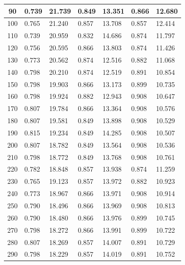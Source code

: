 \documentclass{report}
\begin{document}
\begin{minipage}{\textwidth}
\begin{longtable}{|c|l|l|l|l|l|l|}
                     90 & 0.739 & 21.739 & 0.849 & 13.351 & 0.866 & 12.680 \\ \hline
                     100 & 0.765 & 21.240 & 0.857 & 13.708 & 0.857 & 12.414 \\ \hline
                     110 & 0.739 & 20.959 & 0.832 & 14.686 & 0.874 & 11.797 \\ \hline
                     120 & 0.756 & 20.595 & 0.866 & 13.803 & 0.874 & 11.426 \\ \hline
                     130 & 0.773 & 20.562 & 0.874 & 12.516 & 0.882 & 11.068 \\ \hline
                     140 & 0.798 & 20.210 & 0.874 & 12.519 & 0.891 & 10.854 \\ \hline
                     150 & 0.798 & 19.903 & 0.866 & 13.173 & 0.899 & 10.735 \\ \hline
                     160 & 0.798 & 19.924 & 0.882 & 12.943 & 0.908 & 10.647 \\ \hline
                     170 & 0.807 & 19.784 & 0.866 & 13.364 & 0.908 & 10.576 \\ \hline
                     180 & 0.807 & 19.581 & 0.849 & 13.898 & 0.908 & 10.529 \\ \hline
                     190 & 0.815 & 19.234 & 0.849 & 14.285 & 0.908 & 10.507 \\ \hline
                     200 & 0.807 & 18.782 & 0.849 & 13.564 & 0.908 & 10.536 \\ \hline
                     210 & 0.798 & 18.772 & 0.849 & 13.768 & 0.908 & 10.761 \\ \hline
                     220 & 0.782 & 18.848 & 0.857 & 13.938 & 0.874 & 11.259 \\ \hline
                     230 & 0.765 & 19.123 & 0.857 & 13.972 & 0.882 & 10.923 \\ \hline
                     240 & 0.773 & 18.967 & 0.866 & 13.971 & 0.908 & 10.914 \\ \hline
                     250 & 0.790 & 18.496 & 0.866 & 13.969 & 0.908 & 10.813 \\ \hline
                     260 & 0.790 & 18.480 & 0.866 & 13.976 & 0.899 & 10.745 \\ \hline
                     270 & 0.798 & 18.272 & 0.866 & 13.991 & 0.899 & 10.722 \\ \hline
                     280 & 0.807 & 18.269 & 0.857 & 14.007 & 0.891 & 10.729 \\ \hline
                     290 & 0.798 & 18.229 & 0.857 & 14.019 & 0.891 & 10.752 \\ \hline

\end{longtable}
\end{minipage}
\end{document}
